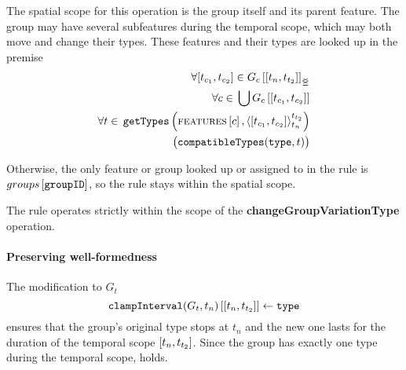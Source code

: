    The spatial scope for this operation is the group itself and its parent feature. The group may have several subfeatures during the temporal scope, which may both move and change their types. These features and their types are looked up in the premise
\[
   \begin{split}
        \forall \interval{t_{c_1}}{t_{c_2}} \in \overlapping{G_c}{t_n}{t_{t_2}}\\ %
        \forall c \in \, \bigcup \lookup{G_c}{\interval{t_{c_1}}{t_{c_2}}}\\ %
        \forall t \in \, \var{getTypes}\left(\lookup{\features}{c}, \clamp{\interval{t_{c_1}}{t_{c_2}}}{t_n}{t_{t_2}}\right) \\ %
        \big(\var{compatibleTypes}(\var{type}, t)\big)
   \end{split}
\]

Otherwise, the only feature or group looked up or assigned to in the rule is $groups \left[ \texttt{groupID} \right]$, so the rule stays within the spatial scope.
\\

\begin{lemma}
   The  rule operates strictly within the scope of the \textbf{changeGroupVariationType} operation.
   \label{lemma:change-group-variation-type-scope}
\end{lemma}

\paragraph{Preserving well-formedness}

The modification to $G_t$
\[
   \lookup{\var{clampInterval}(G_t, t_n)}{\interval{t_n}{t_{t_2}}} \assign \var{type}
\]
ensures that the group's original type stops at $t_n$ and the new one lasts for the duration of the temporal scope $\interval{t_n}{t_{t_2}}$. Since the group has exactly one type during the temporal scope,  holds.

